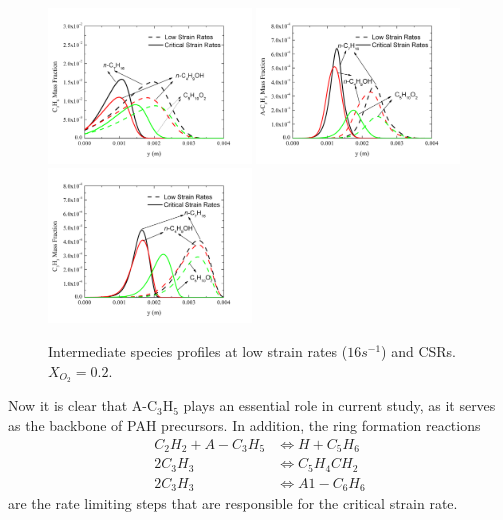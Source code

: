 \documentclass[preprint,3p,times,twocolumn]{elsarticleUS}
\begin{document}
\begin{figure}[ht]
  \includegraphics[trim=4mm 8mm 30mm 20mm, clip=true, width=0.48\textwidth]{C3H6-y.png}
  \includegraphics[trim=4mm 8mm 30mm 20mm, clip=true, width=0.48\textwidth]{A-C3H5-y.png}
  \includegraphics[trim=4mm 8mm 30mm 20mm, clip=true, width=0.48\textwidth]{C3H3-y.png}
  \normalsize
  \vspace{-0.2in}
  \caption{Intermediate species profiles at low strain rates ($16 s^{-1}$) and CSRs. $X_{O_2}=0.2$.}
  \label{fig:CxHy}
\end{figure}

Now it is clear that A-C$_3$H$_5$ plays an essential role in current study, as it serves as the backbone of PAH precursors. In addition, the ring formation reactions 
\begin{align*}
  C_2H_2 + A-C_3H_5 &\Longleftrightarrow H + C_5H_6\\
  2 C_3H_3 &\Longleftrightarrow C_5H_4CH_2\\
  2 C_3H_3 &\Longleftrightarrow A1-C_6H_6
\end{align*}
are the rate limiting steps that are responsible for the critical strain rate.
\end{document}
